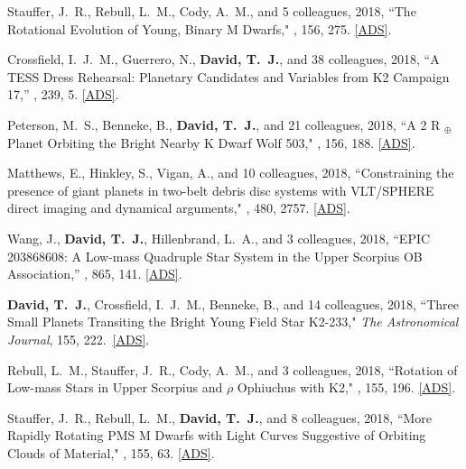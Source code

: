 \item {Stauffer}, J.~R., {Rebull}, L.~M., {Cody}, A.~M., and 5 colleagues, 2018, ``{The Rotational Evolution of Young, Binary M Dwarfs}," \aj, 156, 275. \href{https://ui.adsabs.harvard.edu/abs/2018AJ....156..275S/abstract}{[ADS]}.

\item {Crossfield}, I.~J.~M., {Guerrero}, N., {\bf {David}, T.~J.}, and 38 colleagues, 2018, ``{A TESS Dress Rehearsal: Planetary Candidates and Variables from K2 Campaign 17},'' \apjs, 239, 5. \href{https://ui.adsabs.harvard.edu/#abs/2018arXiv180603127C}{[ADS]}.

\item {Peterson}, M.~S., {Benneke}, B., {\bf {David}, T.~J.}, and 21 colleagues, 2018, ``{A 2 R $_{{\ensuremath{\oplus}}}$ Planet Orbiting the Bright Nearby K Dwarf Wolf 503}," \aj, 156, 188. \href{https://ui.adsabs.harvard.edu/#abs/2018AJ....156..188P}{[ADS]}.

\item {Matthews}, E., {Hinkley}, S., {Vigan}, A., and 10 colleagues, 2018, ``{Constraining the presence of giant planets in two-belt debris disc systems with VLT/SPHERE direct imaging and dynamical arguments}," \mnras, 480, 2757. \href{https://ui.adsabs.harvard.edu/#abs/2018MNRAS.480.2757M}{[ADS]}.

\item {Wang}, J., {\bf {David}, T.~J.}, {Hillenbrand}, L.~A., and 3 colleagues, 2018, ``{EPIC 203868608: A Low-mass Quadruple Star System in the Upper Scorpius OB Association},'' \apj, 865, 141. \href{https://ui.adsabs.harvard.edu/#abs/2018ApJ...865..141W}{[ADS]}.

\item {\bf {\bf David, T.}~J.}, {Crossfield}, I.~J.~M., {Benneke}, B., and 14 colleagues, 2018, ``{Three Small Planets Transiting the Bright Young Field Star K2-233}," \textit{The Astronomical Journal}, 155, 222.\ \href{https://ui.adsabs.harvard.edu/#abs/2018AJ....155..222D/}{[ADS]}. 

\item {Rebull}, L.~M., {Stauffer}, J.~R., {Cody}, A.~M., and 3 colleagues, 2018, ``{Rotation of Low-mass Stars in Upper Scorpius and {\ensuremath{\rho}} Ophiuchus with K2}," \aj, 155, 196. \href{https://ui.adsabs.harvard.edu/#abs/2018AJ....155..196R}{[ADS]}.

\item {Stauffer}, J.~R., {Rebull}, L.~M., {\bf {David}, T.~J.}, and 8 colleagues, 2018, ``{More Rapidly Rotating PMS M Dwarfs with Light Curves Suggestive of Orbiting Clouds of Material}," \aj, 155, 63. \href{https://ui.adsabs.harvard.edu/#abs/2018AJ....155...63S}{[ADS]}.

